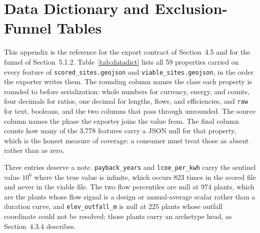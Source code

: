 \documentclass[12pt,letterpaper]{report}
\begin{document}
\appendix
\chapter{Data Dictionary and Exclusion-Funnel Tables}

This appendix is the reference for the export contract of Section~4.5 and for the
funnel of Section~5.1.2. Table~\ref{tab:datadict} lists all 59 properties carried
on every feature of \texttt{scored\_sites.geojson} and
\texttt{viable\_sites.geojson}, in the order the exporter writes them. The
rounding column names the class each property is rounded to before serialization:
whole numbers for currency, energy, and counts, four decimals for ratios, one
decimal for lengths, flows, and efficiencies, and \texttt{raw} for text, booleans,
and the two columns that pass through unrounded. The source column names the phase
the exporter joins the value from. The final column counts how many of the 3{,}778
features carry a JSON null for that property, which is the honest measure of
coverage: a consumer must treat those as absent rather than as zero.

Three entries deserve a note. \texttt{payback\_years} and \texttt{lcoe\_per\_kwh}
carry the sentinel value $10^6$ where the true value is infinite, which occurs 823
times in the scored file and never in the viable file. The two flow percentiles are
null at 974 plants, which are the plants whose flow signal is a design or
annual-average scalar rather than a duration curve, and \texttt{elev\_outfall\_m}
is null at 225 plants whose outfall coordinate could not be resolved; those
plants carry an archetype head, as Section~4.3.4 describes.
\end{document}
